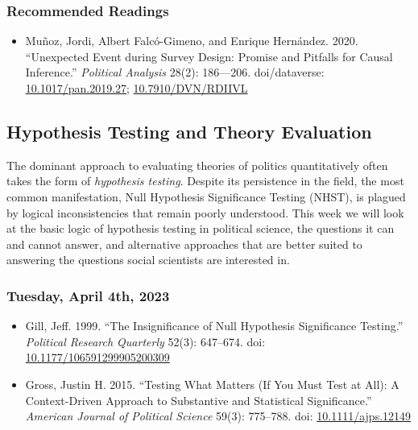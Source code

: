 \documentclass[12pt,]{article}
\providecommand{\tightlist}{%
  \setlength{\itemsep}{0pt}\setlength{\parskip}{0pt}}
\begin{document}
\hypertarget{recommended-readings-7}{%
\subsubsection{Recommended Readings}\label{recommended-readings-7}}

\begin{itemize}
\tightlist
\item
  Muñoz, Jordi, Albert Falcó-Gimeno, and Enrique Hernández. 2020.
  ``Unexpected Event during Survey Design: Promise and Pitfalls for
  Causal Inference.'' \emph{Political Analysis} 28(2): 186---206.
  doi/dataverse:
  \href{https://doi.org/10.1017/pan.2019.27}{10.1017/pan.2019.27};
  \href{https://doi.org/10.7910/DVN/RDIIVL}{10.7910/DVN/RDIIVL}
\end{itemize}

\hypertarget{hypothesis-testing-and-theory-evaluation}{%
\subsection{Hypothesis Testing and Theory
Evaluation}\label{hypothesis-testing-and-theory-evaluation}}

\noindent The dominant approach to evaluating theories of politics
quantitatively often takes the form of \emph{hypothesis testing}.
Despite its persistence in the field, the most common manifestation,
Null Hypothesis Significance Testing (NHST), is plagued by logical
inconsistencies that remain poorly understood. This week we will look at
the basic logic of hypothesis testing in political science, the
questions it can and cannot answer, and alternative approaches that are
better suited to answering the questions social scientists are
interested in.

\hypertarget{tuesday-april-4th-2023}{%
\subsubsection{Tuesday, April 4th, 2023}\label{tuesday-april-4th-2023}}

\begin{itemize}
\item
  Gill, Jeff. 1999. ``The Insignificance of Null Hypothesis Significance
  Testing.'' \emph{Political Research Quarterly} 52(3): 647--674. doi:
  \href{https://doi.org/10.1177/106591299905200309}{10.1177/106591299905200309}
\item
  Gross, Justin H. 2015. ``Testing What Matters (If You Must Test at
  All): A Context-Driven Approach to Substantive and Statistical
  Significance.'' \emph{American Journal of Political Science} 59(3):
  775--788. doi:
  \href{https://doi.org/10.1111/ajps.12149}{10.1111/ajps.12149}
\end{itemize}
\end{document}

